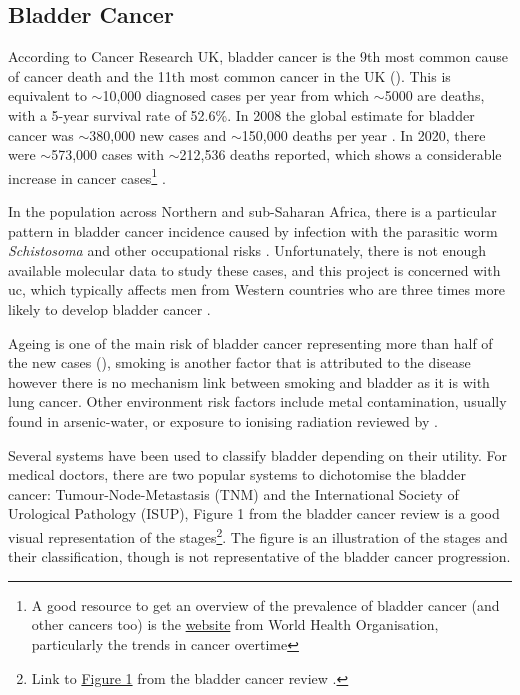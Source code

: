 \subsection{Bladder Cancer} \label{s:lit:bladder_cancer}

According to Cancer Research UK, bladder cancer is the 9th most common cause of cancer death and the 11th most common cancer in the UK (\citeyear{Cancer_Research_UK2015-cf}). This is equivalent to $\sim$10,000 diagnosed cases per year from which  $\sim$5000 are deaths, with a 5-year survival rate of 52.6\%. In 2008 the global estimate for bladder cancer was $\sim$380,000 new cases and $\sim$150,000 deaths per year \citep{Ferlay2010-sx}. In 2020, there were $\sim$573,000 cases with $\sim$212,536 deaths reported, which shows a considerable increase in cancer cases\footnote{A good resource to get an overview of the prevalence of bladder cancer (and other cancers too) is the \href{https://gco.iarc.fr/en}{website} from World Health Organisation, particularly the trends in cancer overtime} \citep{Sung2021-hn}. 

In the population across Northern and sub-Saharan Africa, there is a particular pattern in bladder cancer incidence caused by infection with the parasitic worm \textit{Schistosoma} and other occupational risks \citep{Ferlay2010-sx}. Unfortunately, there is not enough available molecular data to study these cases, and this project is concerned with \acrfull{uc}, which typically affects men from Western countries who are three times more likely to develop bladder cancer \citep{Knowles2015-mu}.
 

Ageing is one of the main risk of bladder cancer representing more than half of the new cases (\citeyear{Cancer_Research_UK2015-cf}), smoking is another factor that is attributed to the disease \citep{Knowles2015-mu} however there is no mechanism link between smoking and bladder as it is with lung cancer. Other environment risk factors include metal contamination, usually found in arsenic-water, or exposure to ionising radiation reviewed by \citep{Knowles2015-mu}. 

Several systems have been used to classify bladder depending on their utility. For medical doctors, there are two popular systems to dichotomise the bladder cancer: Tumour-Node-Metastasis (TNM) and the International Society of Urological Pathology (ISUP), Figure 1 from the bladder cancer review \citep{Knowles2015-mu} is a good visual representation of the stages\footnote{Link to \href{https://www.nature.com/articles/nrc3817/figures/1}{Figure 1} from the bladder cancer review \citep{Knowles2015-mu}.}. The figure is an illustration of the stages and their classification, though is not representative of the bladder cancer progression.


